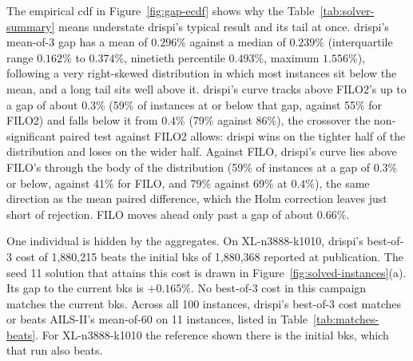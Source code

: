 The empirical \gls{cdf} in Figure~\ref{fig:gap-ecdf} shows why the Table~\ref{tab:solver-summary} means
understate \gls{drispi}'s typical result and its tail at once. \gls{drispi}'s mean-of-3
gap has a mean of $0.296\%$ against a median of $0.239\%$ (interquartile range
$0.162\%$ to $0.374\%$, ninetieth percentile $0.493\%$, maximum $1.556\%$), following a very
right-skewed distribution in which most instances sit below the mean, and a
long tail sits well above it. \gls{drispi}'s curve tracks above FILO2's up to a gap
of about $0.3\%$ (59\% of instances at or below that gap, against 55\% for
FILO2) and falls below it from $0.4\%$ (79\% against 86\%), the crossover the
non-significant paired test against FILO2 allows: \gls{drispi} wins on the tighter
half of the distribution and loses on the wider half. Against FILO, \gls{drispi}'s
curve lies above FILO's through the body of the distribution (59\% of instances
at a gap of $0.3\%$ or below, against 41\% for FILO, and 79\% against 69\% at
$0.4\%$), the same direction as the mean paired difference, which the Holm
correction leaves just short of rejection. FILO moves ahead only past a gap of about $0.66\%$.

One individual is hidden by the aggregates. On XL-n3888-k1010, \gls{drispi}'s
best-of-3 cost of 1,880,215 beats the initial \gls{bks} of 1,880,368
\citet{queirogaXLInstancesCapacitated2026} reported at publication. The seed 11 solution that attains this cost is drawn in Figure~\ref{fig:solved-instances}(a). Its gap to the current \gls{bks} is $+0.165\%$. No best-of-3 cost in this
campaign matches the current \gls{bks}. Across all 100 instances, \gls{drispi}'s
best-of-3 cost matches or beats AILS-II's mean-of-60 on 11 instances, listed in
Table~\ref{tab:matches-beats}. For XL-n3888-k1010 the reference shown
there is the initial \gls{bks}, which that run also beats.

